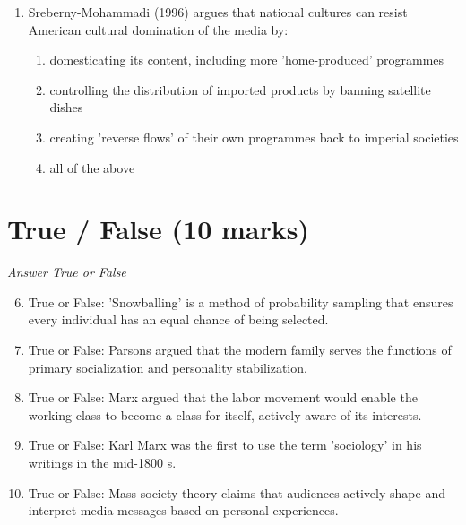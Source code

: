 \documentclass[12pt]{article}
\begin{document}
\begin{enumerate}[label=\arabic*.]
\begin{enumerate}[label=(\alph*)]
    \item the state's power can be exercised through several different administrative structures
    \item the ruling elite is composed of people from various class backgrounds
    \item political parties must compete for the votes of 'consumers' in the electorate
    \item there is a close alignment between class background and party preference
\end{enumerate}
\item Sreberny-Mohammadi (1996) argues that national cultures can resist American cultural domination of the media by:
\begin{enumerate}[label=(\alph*)]
    \item domesticating its content, including more 'home-produced' programmes
    \item controlling the distribution of imported products by banning satellite dishes
    \item creating 'reverse flows' of their own programmes back to imperial societies
    \item all of the above
\end{enumerate}
\end{enumerate}

\section*{True / False (10 marks)}
\textit{Answer True or False}
\begin{enumerate}[label=\arabic*.]
\setcounter{enumi}{5}
\item True or False: 'Snowballing' is a method of probability sampling that ensures every individual has an equal chance of being selected.
\item True or False: Parsons argued that the modern family serves the functions of primary socialization and personality stabilization.
\item True or False: Marx argued that the labor movement would enable the working class to become a class for itself, actively aware of its interests.
\item True or False: Karl Marx was the first to use the term 'sociology' in his writings in the mid-1800 s.
\item True or False: Mass-society theory claims that audiences actively shape and interpret media messages based on personal experiences.
\end{enumerate}
\end{document}
